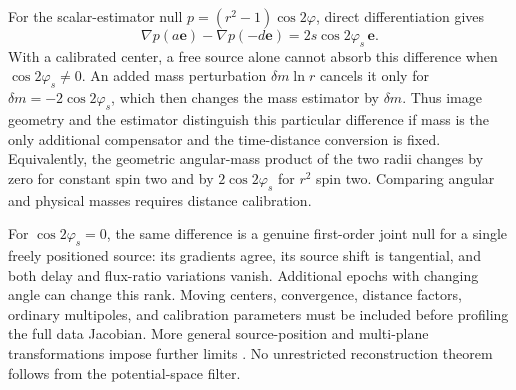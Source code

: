 For the scalar-estimator null $p=(r^2-1)\cos2\varphi$, direct differentiation gives
\begin{equation}
 \nabla p(a\mathbf e)-\nabla p(-d\mathbf e)
 =2s\cos2\varphi_s\,\mathbf e.
\end{equation}
With a calibrated center, a free source alone cannot absorb this difference when $\cos2\varphi_s\ne0$. An added mass perturbation $\delta m\ln r$ cancels it only for $\delta m=-2\cos2\varphi_s$, which then changes the mass estimator by $\delta m$. Thus image geometry and the estimator distinguish this particular difference if mass is the only additional compensator and the time-distance conversion is fixed. Equivalently, the geometric angular-mass product of the two radii changes by zero for constant spin two and by $2\cos2\varphi_s$ for $r^2$ spin two. Comparing angular and physical masses requires distance calibration.

For $\cos2\varphi_s=0$, the same difference is a genuine first-order joint null for a single freely positioned source: its gradients agree, its source shift is tangential, and both delay and flux-ratio variations vanish. Additional epochs with changing angle can change this rank. Moving centers, convergence, distance factors, ordinary multipoles, and calibration parameters must be included before profiling the full data Jacobian. More general source-position and multi-plane transformations impose further limits \cite{SchneiderSluse2014,Schneider1997,Schneider2019,Fleury2021}. No unrestricted reconstruction theorem follows from the potential-space filter.
